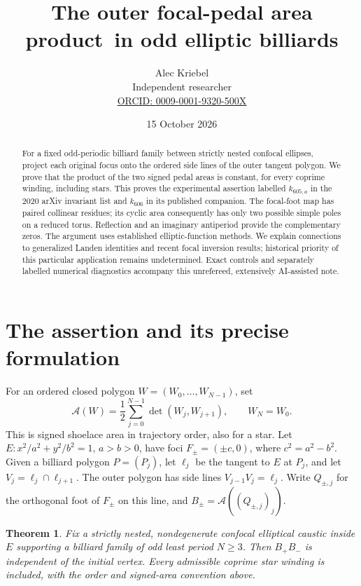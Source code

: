 \documentclass[11pt]{article}
\title{The outer focal-pedal area product\ in odd elliptic billiards}
\author{Alec Kriebel\\Independent researcher\\
\small\href{https://orcid.org/0009-0001-9320-500X}{ORCID: 0009-0001-9320-500X}}
\date{15 October 2026}
\newtheorem{theorem}{Theorem}
\newcommand{\Area}{\mathcal A}
\begin{document}
\maketitle
\begin{abstract}
For a fixed odd-periodic billiard family between strictly nested confocal
ellipses, project each original focus onto the ordered side lines of the outer
tangent polygon. We prove that the product of the two signed pedal areas is
constant, for every coprime winding, including stars. This proves the
experimental assertion labelled $k_{605,a}$ in the 2020 arXiv invariant list
and $k_{606}$ in its published companion. The focal-foot map has paired
collinear residues; its cyclic area consequently has only two possible simple
poles on a reduced torus. Reflection and an imaginary antiperiod provide the
complementary zeros. The argument uses established elliptic-function methods.
We explain connections to generalized Landen identities and recent focal
inversion results; historical priority of this particular application remains
undetermined. Exact controls and separately labelled numerical diagnostics
accompany this unrefereed, extensively AI-assisted note.
\end{abstract}

\section{The assertion and its precise formulation}
For an ordered closed polygon $W=(W_0,\ldots,W_{N-1})$, set
\begin{equation}\label{eq:area}
 \Area(W)=\frac12\sum_{j=0}^{N-1}\det(W_j,W_{j+1}),\qquad W_N=W_0.
\end{equation}
This is signed shoelace area in trajectory order, also for a star.
Let $E:x^2/a^2+y^2/b^2=1$, $a>b>0$, have foci
$F_\pm=(\pm c,0)$, where $c^2=a^2-b^2$. Given a billiard polygon
$P=(P_j)$, let $\ell_j$ be the tangent to $E$ at $P_j$, and let
$V_j=\ell_j\cap\ell_{j+1}$. The outer polygon has side lines
$V_{j-1}V_j=\ell_j$. Write $Q_{\pm,j}$ for the orthogonal foot of
$F_\pm$ on this line, and $B_\pm=\Area((Q_{\pm,j})_j)$.

\begin{theorem}\label{thm:main}
Fix a strictly nested, nondegenerate confocal elliptical caustic inside $E$
supporting a billiard family of odd least period $N\geq3$. Then $B_+B_-$
is independent of the initial vertex. Every admissible coprime star winding
is included, with the order and signed-area convention above.
\end{theorem}
\end{document}
